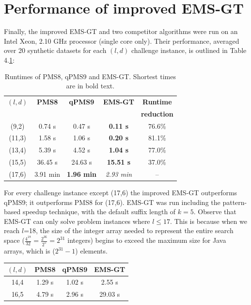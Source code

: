 \documentclass[oneside,12pt]{DISCSthesis}
\begin{document}
{	\section{Performance of improved EMS-GT}
		Finally, the improved EMS-GT and two competitor algorithms were run on an Intel Xeon, 2.10 GHz processor (single core only). Their performance, averaged over 20 synthetic datasets for each $(l,d)$ challenge instance, is outlined in Table 4.\ref{tbl:runtimes_v_pms}:

		\begin{table}[ht] %
			\small
			\renewcommand{\arraystretch}{1.3}
			\label{tbl:runtimes_v_pms}
			\centering
			\begin{tabular}{|c|c|c|c|c|}
			\hline \bfseries\boldmath $(l,d)$ & \bfseries PMS8 & \bfseries qPMS9 & \bfseries EMS-GT & \bfseries Runtime\\
			& & & & \bfseries reduction \\
			\hline
			 (9,2) &  0.74 s  &  0.47 s & {\bf 0.11 s} & 76.6\%\\
			(11,3) &  1.58 s  &  1.06 s & {\bf 0.20 s} & 81.1\%\\
			(13,4) &  5.39 s  &  4.52 s & {\bf 1.04 s} & 77.0\%\\
			(15,5) & 36.45 s  & 24.63 s & {\bf15.51 s} & 37.0\%\\
			(17,6) &  3.91 min & \textbf{1.96 min} & {\emph{2.93 min}} & --\\
			\hline\end{tabular}

			\caption{\small Runtimes of PMS8, qPMS9 and EMS-GT. Shortest times are in bold text.}
			\end{table}

		For every challenge instance except (17,6) the improved EMS-GT outperforms qPMS9; it outperforms PMS8 for (17,6). EMS-GT was run including the pattern-based speedup technique, with the default suffix length of $k=5$. Observe that EMS-GT can only solve problem instances where $l \leq 17$. This is because when we reach $l$=18, the size of the integer array needed to represent the entire search space ($\frac{4^{18}}{32} = \frac{2^{36}}{2^{5}} = 2^{31}$ integers) begins to exceed the maximum size for Java arrays, which is ($2^{31} - 1$) elements.\newline

		\begin{table}[ht] %
			\small
			\renewcommand{\arraystretch}{1.3}
			\label{tbl:runtimes_nonchallenge}
			\centering
			\begin{tabular}{|c|c|c|c|}
			\hline \bfseries\boldmath $(l,d)$ & \bfseries PMS8 & \bfseries qPMS9 & \bfseries EMS-GT \\
			\hline
			14,4 &  1.29 s  &  1.02 s &      2.55 s\\
			16,5 &  4.79 s  &  2.96 s &     29.03 s\\
			\hline\end{tabular}


\end{table}}
\end{document}
